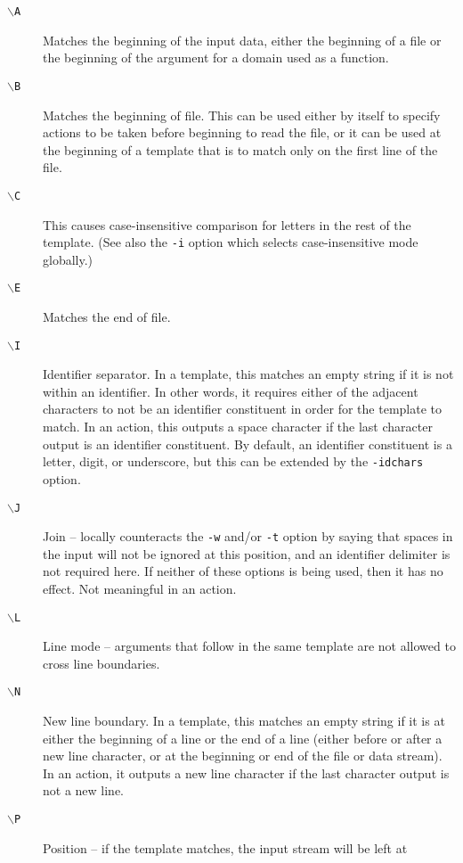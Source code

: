 \begin{description}
\item[{\tt $\backslash$A}]
Matches the beginning of the input data, either the beginning of a file
or the beginning of the argument for a domain used as a function.
\item[{\tt $\backslash$B}]
Matches the beginning of file.
This can be used either by itself to specify actions to be taken before
beginning to read the file, or it can be used at the beginning of a
template that is to match only on the first line of the file.
\item[{\tt $\backslash$C}]
This causes case-insensitive comparison for letters in the rest of the
template.  (See also the \verb/-i/ option which selects case-insensitive
mode globally.)
\item[{\tt $\backslash$E}]
Matches the  end of file.
\item[{\tt $\backslash$I}]
Identifier separator.  In a template, this matches an empty string if it
is not within an identifier.  In other words, it requires either of the
adjacent characters to not be an identifier constituent in order for the
template to match.
In an action, this outputs a space character if the last character
output is an identifier constituent.
By default, an identifier constituent is a letter, digit, or underscore,
but this can be extended by the \verb/-idchars/ option.
\item[{\tt $\backslash$J}]
Join -- locally counteracts the \verb/-w/ and/or \verb/-t/
option by saying that spaces in the input will not be ignored at this
position, and an identifier delimiter is not required here.
If neither of these options is being used, then it has no effect.
Not meaningful in an action.
\item[{\tt $\backslash$L}]
Line mode -- arguments that follow in the same template are not allowed
to cross line boundaries.
\item[{\tt $\backslash$N}]
New line boundary.
In a template, this matches an empty string if it is at either the
beginning of a line or the end of a line (either before or after a new
line character, or at the beginning or end of the file or data stream).
In an action, it outputs a new line character if the last character
output is not a new line.
\item[{\tt $\backslash$P}]
Position -- if the template matches, the input stream will be left at

\end{description}
